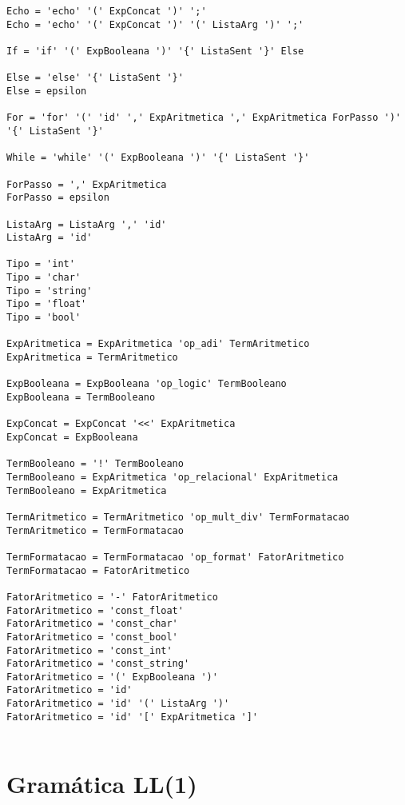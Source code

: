 \documentclass[
  12pt,				%
  oneside,			%
  a4paper,			%
  english,			%
  french,				%
  spanish,			%
  brazil,				%
]{abntex2}
\begin{document}
\begin{lstlisting}[label={code:gramatica-original},caption={Gramática
    original da linguagem de programação LisC.},style={mystyle}]
Echo = 'echo' '(' ExpConcat ')' ';'
Echo = 'echo' '(' ExpConcat ')' '(' ListaArg ')' ';'

If = 'if' '(' ExpBooleana ')' '{' ListaSent '}' Else

Else = 'else' '{' ListaSent '}'
Else = epsilon

For = 'for' '(' 'id' ',' ExpAritmetica ',' ExpAritmetica ForPasso ')' '{' ListaSent '}'

While = 'while' '(' ExpBooleana ')' '{' ListaSent '}'

ForPasso = ',' ExpAritmetica
ForPasso = epsilon

ListaArg = ListaArg ',' 'id'
ListaArg = 'id'

Tipo = 'int'
Tipo = 'char'
Tipo = 'string'
Tipo = 'float'
Tipo = 'bool'

ExpAritmetica = ExpAritmetica 'op_adi' TermAritmetico
ExpAritmetica = TermAritmetico

ExpBooleana = ExpBooleana 'op_logic' TermBooleano
ExpBooleana = TermBooleano

ExpConcat = ExpConcat '<<' ExpAritmetica
ExpConcat = ExpBooleana

TermBooleano = '!' TermBooleano
TermBooleano = ExpAritmetica 'op_relacional' ExpAritmetica
TermBooleano = ExpAritmetica

TermAritmetico = TermAritmetico 'op_mult_div' TermFormatacao
TermAritmetico = TermFormatacao

TermFormatacao = TermFormatacao 'op_format' FatorAritmetico
TermFormatacao = FatorAritmetico

FatorAritmetico = '-' FatorAritmetico
FatorAritmetico = 'const_float'
FatorAritmetico = 'const_char'
FatorAritmetico = 'const_bool'
FatorAritmetico = 'const_int'
FatorAritmetico = 'const_string'
FatorAritmetico = '(' ExpBooleana ')'
FatorAritmetico = 'id'
FatorAritmetico = 'id' '(' ListaArg ')'
FatorAritmetico = 'id' '[' ExpAritmetica ']'


\end{lstlisting}

\chapter{Gramática LL(1)}
\label{cha:gramatica-ll1}
\end{document}
